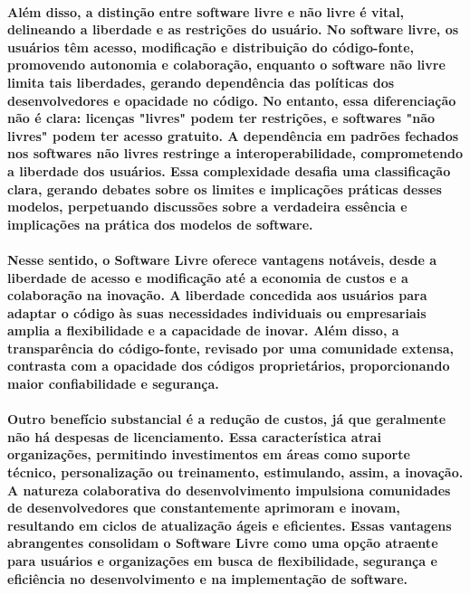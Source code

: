 \documentclass[a4paper, 12pt]{article}
\begin{document}
\paragraph{Além disso, a distinção entre software livre e não livre é vital, delineando a liberdade e as restrições do usuário. No software livre, os usuários têm acesso, modificação e distribuição do código-fonte, promovendo autonomia e colaboração, enquanto o software não livre limita tais liberdades, gerando dependência das políticas dos desenvolvedores e opacidade no código. No entanto, essa diferenciação não é clara: licenças "livres" podem ter restrições, e softwares "não livres" podem ter acesso gratuito. A dependência em padrões fechados nos softwares não livres restringe a interoperabilidade, comprometendo a liberdade dos usuários. Essa complexidade desafia uma classificação clara, gerando debates sobre os limites e implicações práticas desses modelos, perpetuando discussões sobre a verdadeira essência e implicações na prática dos modelos de software.}

\paragraph{Nesse sentido, o Software Livre oferece vantagens notáveis, desde a liberdade de acesso e modificação até a economia de custos e a colaboração na inovação. A liberdade concedida aos usuários para adaptar o código às suas necessidades individuais ou empresariais amplia a flexibilidade e a capacidade de inovar. Além disso, a transparência do código-fonte, revisado por uma comunidade extensa, contrasta com a opacidade dos códigos proprietários, proporcionando maior confiabilidade e segurança.}
\paragraph{Outro benefício substancial é a redução de custos, já que geralmente não há despesas de licenciamento. Essa característica atrai organizações, permitindo investimentos em áreas como suporte técnico, personalização ou treinamento, estimulando, assim, a inovação. A natureza colaborativa do desenvolvimento impulsiona comunidades de desenvolvedores que constantemente aprimoram e inovam, resultando em ciclos de atualização ágeis e eficientes. Essas vantagens abrangentes consolidam o Software Livre como uma opção atraente para usuários e organizações em busca de flexibilidade, segurança e eficiência no desenvolvimento e na implementação de software.}
\end{document}
